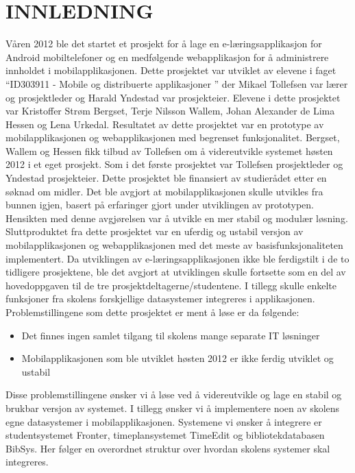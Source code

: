 \documentclass[../main.tex]{subfiles}
\begin{document}
\chapter{INNLEDNING}

Våren 2012 ble det startet et prosjekt for å lage en e-læringsapplikasjon for Android mobiltelefoner og en medfølgende webapplikasjon for å administrere innholdet i mobilapplikasjonen. Dette prosjektet var utviklet av elevene i faget “ID303911 - Mobile og distribuerte applikasjoner ” der Mikael Tollefsen var lærer og prosjektleder og Harald Yndestad var prosjekteier. Elevene i dette prosjektet var Kristoffer Strøm Bergset, Terje Nilsson Wallem, Johan Alexander de Lima Hessen og Lena Urkedal. Resultatet av dette prosjektet var en prototype av mobilapplikasjonen og webapplikasjonen med begrenset funksjonalitet.\newline
\newline
Bergset, Wallem og Hessen fikk tilbud av Tollefsen om å videreutvikle systemet høsten 2012 i et eget prosjekt. Som i det første prosjektet var Tollefsen prosjektleder og Yndestad prosjekteier. Dette prosjektet ble finansiert av studierådet etter en søknad om midler. Det ble avgjort at mobilapplikasjonen skulle utvikles fra bunnen igjen, basert på erfaringer gjort under utviklingen av prototypen. Hensikten med denne avgjørelsen var å utvikle en mer stabil og modulær løsning. Sluttproduktet fra dette prosjektet var en uferdig og ustabil versjon av mobilapplikasjonen og webapplikasjonen med det meste av basisfunksjonaliteten implementert.\newline
\newline
Da utviklingen av e-læringsapplikasjonen ikke ble ferdigstilt i de to tidligere prosjektene, ble det avgjort at utviklingen skulle fortsette som en del av hovedoppgaven til de tre prosjektdeltagerne/studentene. I tillegg skulle enkelte funksjoner fra skolens forskjellige datasystemer integreres i applikasjonen.\newline
Problemstillingene som dette prosjektet er ment å løse er da følgende:
\begin{itemize}
\item Det finnes ingen samlet tilgang til skolens mange separate IT løsninger
\item Mobilapplikasjonen som ble utviklet høsten 2012 er ikke ferdig utviklet og ustabil
\end{itemize}
Disse problemstillingene ønsker vi å løse ved å videreutvikle og lage en stabil og brukbar versjon av systemet. I tillegg ønsker vi å implementere noen av skolens egne datasystemer i mobilapplikasjonen. Systemene vi ønsker å integrere er studentsystemet Fronter, timeplansystemet TimeEdit og bibliotekdatabasen BibSys. Her følger en overordnet struktur over hvordan skolens systemer skal integreres.
\end{document}
